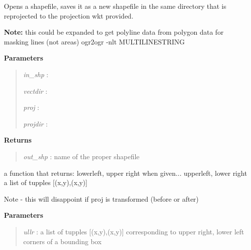 \documentclass[letterpaper,10pt,openany,oneside]{sphinxmanual}
\begin{document}
\begin{fulllineitems}
\label{code:Util.reprojSHP}
Opens a shapefile, saves it as a new shapefile in the same directory
that is reprojected to the projection wkt provided.

\textbf{Note:} this could be expanded to get polyline data from polygon data
for masking lines (not areas) ogr2ogr -nlt MULTILINESTRING

\textbf{Parameters}
\begin{quote}

\emph{in\_shp}  :

\emph{vectdir} :

\emph{proj}    :

\emph{projdir} :
\end{quote}

\textbf{Returns}
\begin{quote}

\emph{out\_shp} : name of the proper shapefile
\end{quote}

\end{fulllineitems}


\begin{fulllineitems}
\label{code:Util.ullr2llur}
a function that returns:
lowerleft, upper right when given...
upperleft, lower right
a list of tupples {[}(x,y),(x,y){]}

Note - this will disappoint if proj is transformed (before or after)

\textbf{Parameters}
\begin{quote}

\emph{ullr} : a list of tupples {[}(x,y),(x,y){]} corresponding to upper right, lower left corners of a bounding box
\end{quote}

\end{fulllineitems}

\end{document}
